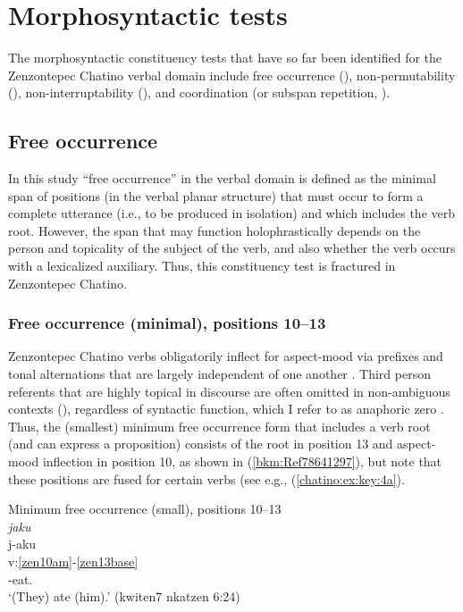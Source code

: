 \documentclass[output=paper]{langscibook}
\begin{document}
\section{Morphosyntactic tests}
\label{bkm:Ref90318239}
The morphosyntactic constituency tests that have so far been identified for the Zenzontepec Chatino verbal domain include free occurrence (), non-per\-mu\-tability (), non-interruptability (), and coordination (or subspan repetition, ).

\subsection{Free occurrence}
\label{bkm:Ref90386630}
In this study “free occurrence” in the verbal domain is defined as the minimal span of positions (in the verbal planar structure) that must occur to form a complete utterance (i.e., to be produced in isolation) and which includes the verb root. However, the span that may function holophrastically depends on the person and topicality of the subject of the verb, and also whether the verb occurs with a lexicalized auxiliary. Thus, this constituency test is fractured in Zenzontepec Chatino.

\subsubsection{Free occurrence (minimal), positions 10{}--13} 
\label{bkm:Ref113307769}
Zenzontepec Chatino verbs obligatorily inflect for aspect-mood via prefixes and tonal alternations that are largely independent of one another \citep{Campbell2019}. Third person referents that are highly topical in discourse are often omitted in non-ambiguous contexts (\citealt{Campbell2015,Campbell2021a}), regardless of syntactic function, which I refer to as anaphoric zero \citep{Givon1983}. Thus, the (smallest) minimum free occurrence form that includes a verb root (and can express a proposition) consists of the root in position 13 and aspect-mood inflection in position 10, as shown in (\ref{bkm:Ref78641297}), but note that these positions are fused for certain verbs (see e.g., (\ref{chatino:ex:key:4a}). 


\ea\label{bkm:Ref78641297} Minimum free occurrence (small), positions 10{}--13 \\
\textit{jaku} \\
\glll j-aku \\
v:\ref{zen10am}-\ref{zen13base} \\  
\Pfv{}-eat.\Third{} \\ 
\glt `(They) ate (him).' (kwiten7 nkatzen 6:24) 
\z 
\end{document}
